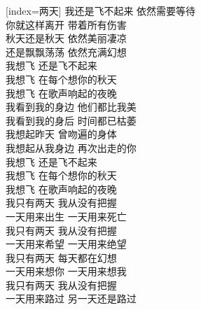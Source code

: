 \begin{songs}{}
  [index={两天}]
	我还是飞不起来 \hspace{5mm} 依然需要等待	\\
	你就这样离开 \hspace{5mm} 带着所有伤害	\\
	秋天还是秋天 \hspace{5mm} 依然美丽凄凉	\\
	还是飘飘荡荡 \hspace{5mm} 依然充满幻想	\\
	\vspace{2ex}
	我想飞 \hspace{5mm} 还是飞不起来	\\
	我想飞 \hspace{5mm} 在每个想你的秋天	\\
	我想飞 \hspace{5mm} 在歌声响起的夜晚	\\
	\vspace{2ex}
	我看到我的身边 \hspace{5mm} 他们都比我美	\\
	我看到我的身后 \hspace{5mm} 时间都已枯萎	\\
	我想起昨天 \hspace{5mm} 曾吻遍的身体	\\
	我想起从我身边 \hspace{5mm} 再次出走的你	\\
	\vspace{2ex}
	我想飞 \hspace{5mm} 还是飞不起来	\\
	我想飞 \hspace{5mm} 在每个想你的秋天	\\
	我想飞 \hspace{5mm} 在歌声响起的夜晚	\\
	\vspace{2ex}
	我只有两天 \hspace{5mm} 我从没有把握	\\
	一天用来出生 \hspace{5mm} 一天用来死亡	\\
	我只有两天 \hspace{5mm} 我从没有把握	\\
	一天用来希望 \hspace{5mm} 一天用来绝望	\\
	我只有两天 \hspace{5mm} 每天都在幻想	\\
	一天用来想你 \hspace{5mm} 一天用来想我	\\
	我只有两天 \hspace{5mm} 我从没有把握	\\
	一天用来路过 \hspace{5mm} 另一天还是路过 	\\
  \endsong
\end{songs}
